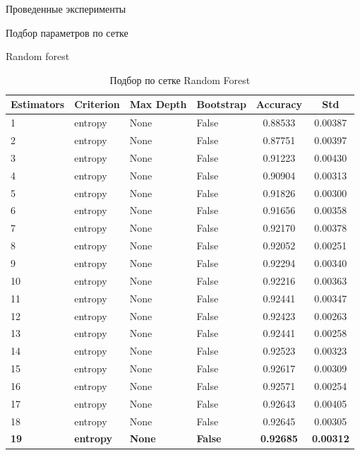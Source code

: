 \begin{section}{Проведенные эксперименты}
\begin{subsection}{Подбор параметров по сетке}
\begin{subsubsection}{Random forest}
  \begin{table}[H]
  \centering
  {\begin{tabular}{|l|l|l|l|c|c|}
  \hline
  \textbf{Estimators} & \textbf{Criterion} & \textbf{Max Depth} & \textbf{Bootstrap} & \textbf{Accuracy} & \textbf{Std} \\
  \hline
  1 & entropy  & None & False & 0.88533 & 0.00387 \\
  \hline
  2 & entropy  & None &  False & 0.87751 & 0.00397 \\
  \hline
  3 & entropy  & None & False & 0.91223 & 0.00430 \\
  \hline
  4 &  entropy & None  & False & 0.90904 & 0.00313 \\
  \hline
  5 & entropy  & None & False & 0.91826 & 0.00300 \\
  \hline
  6 & entropy  & None & False & 0.91656 & 0.00358 \\
  \hline
  7 & entropy  & None & False & 0.92170 & 0.00378 \\
  \hline
  8 &  entropy & None  & False & 0.92052 & 0.00251 \\
  \hline
  9 & entropy  & None & False & 0.92294 & 0.00340 \\
  \hline
  10 & entropy  & None & False & 0.92216 & 0.00363 \\
  \hline
  11  & entropy  & None & False & 0.92441 & 0.00347 \\
  \hline
  12  &  entropy & None  & False & 0.92423 & 0.00263 \\
  \hline
  13  & entropy  & None &  False & 0.92441 & 0.00258 \\
  \hline
  14  & entropy  & None & False & 0.92523 & 0.00323 \\
  \hline
  15 & entropy  & None & False & 0.92617 & 0.00309 \\
  \hline
  16 &  entropy & None  & False & 0.92571 & 0.00254 \\
  \hline
  17 & entropy  & None & False & 0.92643 & 0.00405 \\
  \hline
  18 & entropy  & None &  False & 0.92645 & 0.00305 \\
  \hline
  \textbf{19} & \textbf{entropy}  & \textbf{None} & \textbf{False} & \textbf{0.92685} & \textbf{0.00312} \\
  \hline
  \end{tabular}}

  \caption{Подбор по сетке Random Forest}
  \label{grid:rf}
  \end{table}




\end{subsubsection}
\end{subsection}
\end{section}
